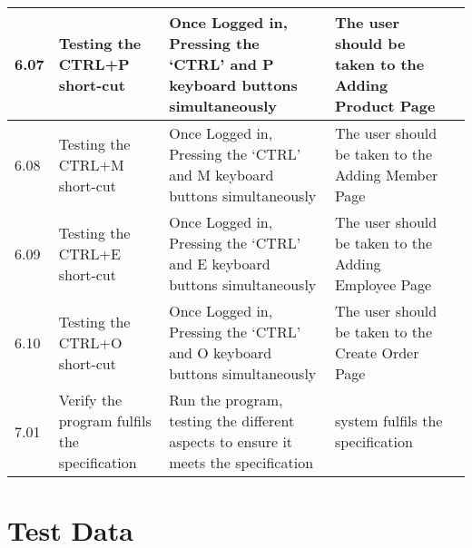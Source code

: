 \begin{flushleft}
\begin{longtable}{|p{1cm}|p{2.5cm}|p{2.5cm}|p{2cm}|p{2cm}|}
	\rowcolor{light-grey} 6.07 & Testing the CTRL+P short-cut & Once Logged in, Pressing the `CTRL' and P keyboard buttons simultaneously & The user should be taken to the Adding Product Page& \\ \hline
	\rowcolor{light-grey} 6.08 & Testing the CTRL+M short-cut & Once Logged in, Pressing the `CTRL' and M keyboard buttons simultaneously & The user should be taken to the Adding Member Page& \\ \hline
	\rowcolor{light-grey} 6.09 & Testing the CTRL+E short-cut & Once Logged in, Pressing the `CTRL' and E keyboard buttons simultaneously & The user should be taken to the Adding Employee Page& \\ \hline
	\rowcolor{light-grey} 6.10 & Testing the CTRL+O short-cut & Once Logged in, Pressing the `CTRL' and O keyboard buttons simultaneously & The user should be taken to the Create Order Page& \\ \hline
	7.01 & Verify the program fulfils the specification & Run the program, testing the different aspects to ensure it meets the specification  & system fulfils the specification & \\ \hline
\end{longtable}
\end{flushleft}

\pagebreak

\section{Test Data}

